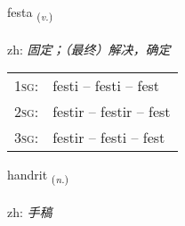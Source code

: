 \documentclass[frontgrid, backgrid]{flacards}\usepackage[]{graphicx}\usepackage[]{color}
\begin{document}
\renewcommand{\flhead}{\vskip5pt \fboxsep=0pt {\small\bfseries\footnotesize Sagnorð | 动词}}
\renewcommand{\fcfoot}{\vskip5pt \fboxsep=0pt \hspace{2pt}{\small\bfseries\footnotesize 2K}}

\renewcommand{\blhead}{\vskip5pt {\small\bfseries\footnotesize Sagnorð | 动词 }}
\renewcommand{\bcfoot}{\vskip5pt \hspace{2pt}{\small\bfseries\footnotesize 2K}}


{festa \small{\textsubscript{(\textit{v.})}} \\[1ex] %
\textphonetic{[fɛsta]} \\
zh: \emph{固定；（最终）解决，确定} \\  [2ex]
\renewcommand*{\arraystretch}{0.8}
\begin{tabular}{p{1cm}l}
\textsc{1sg}: & festi -- festi -- fest \\ 
\textsc{2sg}: & festir -- festir -- fest \\ 
\textsc{3sg}: & festir -- festi -- fest \\ 
\end{tabular}
}

\renewcommand{\flhead}{\vskip5pt \fboxsep=0pt {\small\bfseries\footnotesize Nafnorð | 名词}}
\renewcommand{\fcfoot}{\vskip5pt \fboxsep=0pt \hspace{2pt}{\small\bfseries\footnotesize 2K}}

\renewcommand{\blhead}{\vskip5pt {\small\bfseries\footnotesize Nafnorð | 名词 }}
\renewcommand{\bcfoot}{\vskip5pt \hspace{2pt}{\small\bfseries\footnotesize 2K}}


{handrit \small{\textsubscript{(\textit{n.})}} \\[1ex] %
\textphonetic{[hantrɪt]} \\
zh: \emph{手稿} \\  [2ex]
\renewcommand*{\arraystretch}{0.8}
}
\end{document}
